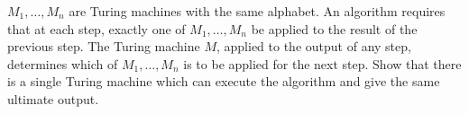 $M_1, \ldots, M_n$ are Turing machines with the same alphabet. An algorithm requires that at each step, exactly one of $M_1, \ldots, M_n$ be applied to the result of the previous step. The Turing machine $M$, applied to the output of any step, determines which of $M_1, \ldots, M_n$ is to be applied for the next step. Show that there is a single Turing machine which can execute the algorithm and give the same ultimate output.
